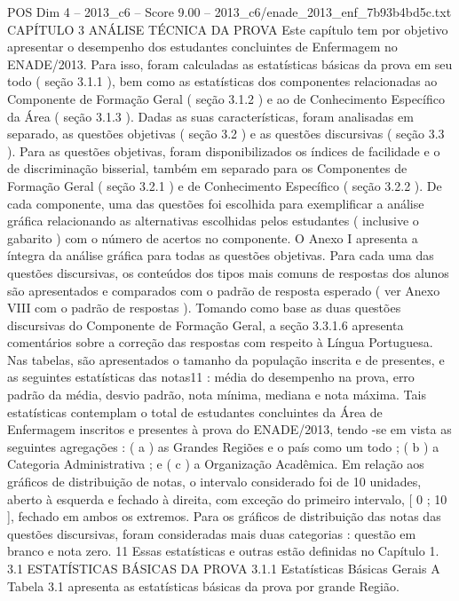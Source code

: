 \begin{textsample}{POS Dim 4 – 2013\_c6 – Score 9.00 – 2013\_c6/enade\_2013\_enf\_7b93b4bd5c.txt}  \label{ex:f4_pos_041}
CAPÍTULO 3 ANÁLISE TÉCNICA DA PROVA Este capítulo tem por objetivo apresentar o desempenho dos estudantes concluintes de Enfermagem no ENADE/2013.
Para isso, foram calculadas as estatísticas básicas da prova em seu todo ( seção 3.1.1 ), bem como as estatísticas dos componentes relacionadas ao Componente de Formação Geral ( seção 3.1.2 ) e ao de Conhecimento Específico da Área ( seção 3.1.3 ).
Dadas as suas características, foram analisadas em separado, as questões objetivas ( seção 3.2 ) e as questões discursivas ( seção 3.3 ).
Para as questões objetivas, foram disponibilizados os índices de facilidade e o de discriminação bisserial, também em separado para os Componentes de Formação Geral ( seção 3.2.1 ) e de Conhecimento Específico ( seção 3.2.2 ).
De cada componente, uma das questões foi escolhida para exemplificar a análise gráfica relacionando as alternativas escolhidas pelos estudantes ( inclusive o gabarito ) com o número de acertos no componente.
O Anexo I apresenta a íntegra da análise gráfica para todas as questões objetivas.
Para cada uma das questões discursivas, os conteúdos dos tipos mais comuns de respostas dos alunos são apresentados e comparados com o padrão de resposta esperado ( ver Anexo VIII com o padrão de respostas ).
Tomando como base as duas questões discursivas do Componente de Formação Geral, a seção 3.3.1.6 apresenta comentários sobre a correção das respostas com respeito à Língua Portuguesa.
Nas tabelas, são apresentados o tamanho da população inscrita e de presentes, e as seguintes estatísticas das notas11 : média do desempenho na prova, erro padrão da média, desvio padrão, nota mínima, mediana e nota máxima.
Tais estatísticas contemplam o total de estudantes concluintes da Área de Enfermagem inscritos e presentes à prova do ENADE/2013, tendo -se em vista as seguintes agregações : ( a ) as Grandes Regiões e o país como um todo ; ( b ) a Categoria Administrativa ; e ( c ) a Organização Acadêmica.
Em relação aos gráficos de distribuição de notas, o intervalo considerado foi de 10 unidades, aberto à esquerda e fechado à direita, com exceção do primeiro intervalo, [ 0 ; 10 ], fechado em ambos os extremos.
Para os gráficos de distribuição das notas das questões discursivas, foram consideradas mais duas categorias : questão em branco e nota zero. 11 Essas estatísticas e outras estão definidas no Capítulo 1. 3.1 ESTATÍSTICAS BÁSICAS DA PROVA 3.1.1 Estatísticas Básicas Gerais A Tabela 3.1 apresenta as estatísticas básicas da prova por grande Região.

\end{textsample}
